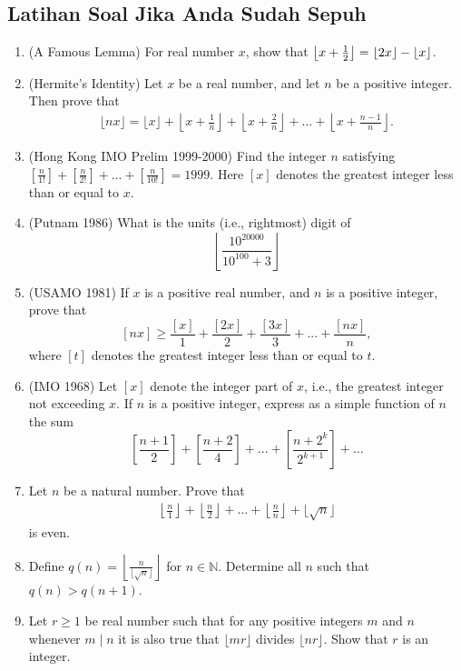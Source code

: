 \documentclass[11pt]{scrartcl}
\begin{document}
\subsection{Latihan Soal Jika Anda Sudah Sepuh}
\begin{enumerate}
    \item (A Famous Lemma) For real number $x$, show that $\left\lfloor x+\frac{1}{2} \right\rfloor = \left\lfloor 2x \right\rfloor-\left\lfloor x \right\rfloor$.

    \item (Hermite's Identity) Let $x$ be a real number, and let $n$ be a positive integer. Then prove that
    \begin{align*}
         \lfloor nx \rfloor = \lfloor x \rfloor + \left\lfloor x+\frac{1}{n} \right\rfloor + \left\lfloor x+\frac{2}{n} \right\rfloor + \dots + \left\lfloor x+\frac{n-1}{n} \right\rfloor.
    \end{align*}
    

    \item (Hong Kong IMO Prelim 1999-2000) Find the integer $n$ satisfying $\left[\frac{n}{1!}\right]+\left[\frac{n}{2!}\right]+...+\left[\frac{n}{10!}\right]=1999$. Here $[x]$ denotes the greatest integer less than or equal to $x$.

    \item (Putnam 1986) What is the units (i.e., rightmost) digit of
\[\left\lfloor \frac{10^{20000}}{10^{100}+3}\right\rfloor\]

    \item  (USAMO 1981) If $x$ is a positive real number, and $n$ is a positive integer, prove that
\[[nx] \geq \frac{[x]}{1} + \frac{[2x]}{2} + \frac{[3x]}{3} + ... + \frac{[nx]}{n},\]where $[t]$ denotes the greatest integer less than or equal to $t$.

    \item (IMO 1968) Let $[x]$ denote the integer part of $x$, i.e., the greatest integer not exceeding $x$. If $n$ is a positive integer, express as a simple function of $n$ the sum\[\left[\frac{n+1}{2}\right]+\left[\frac{n+2}{4}\right]+...+\left[\frac{n+2^k}{2^{k+1}}\right]+\ldots\]

    \item Let $n$ be a natural number. Prove that
    \begin{align*}
        \left\lfloor \frac{n}{1} \right\rfloor + \left\lfloor \frac{n}{2} \right\rfloor + \dots + \left\lfloor \frac{n}{n} \right\rfloor + \lfloor \sqrt{n} \rfloor
    \end{align*}
    is even.

    \item Define $q(n)=\left\lfloor\frac{n}{\lfloor\sqrt{n}\rfloor}\right\rfloor$ for $n \in \mathbb{N}$. Determine all $n$ such that $q(n)>q(n+1)$.

    \item Let $r \ge 1$ be real number such that for any positive integers $m$ and $n$ whenever $m \mid n$ it is also true that $\lfloor mr \rfloor$ divides $\lfloor nr \rfloor$. Show that $r$ is an integer.
\end{enumerate}
\end{document}
